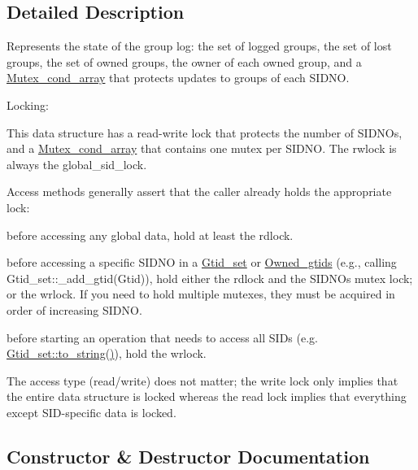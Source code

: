 \subsection{Detailed Description}
Represents the state of the group log\+: the set of logged groups, the set of lost groups, the set of owned groups, the owner of each owned group, and a \mbox{\hyperlink{classMutex__cond__array}{Mutex\+\_\+cond\+\_\+array}} that protects updates to groups of each S\+I\+D\+NO.

Locking\+:

This data structure has a read-\/write lock that protects the number of S\+I\+D\+N\+Os, and a \mbox{\hyperlink{classMutex__cond__array}{Mutex\+\_\+cond\+\_\+array}} that contains one mutex per S\+I\+D\+NO. The rwlock is always the global\+\_\+sid\+\_\+lock.

Access methods generally assert that the caller already holds the appropriate lock\+:


\begin{DoxyItemize}
\item before accessing any global data, hold at least the rdlock.
\item before accessing a specific S\+I\+D\+NO in a \mbox{\hyperlink{classGtid__set}{Gtid\+\_\+set}} or \mbox{\hyperlink{classOwned__gtids}{Owned\+\_\+gtids}} (e.\+g., calling Gtid\+\_\+set\+::\+\_\+add\+\_\+gtid(\+Gtid)), hold either the rdlock and the S\+I\+D\+NO\textquotesingle{}s mutex lock; or the wrlock. If you need to hold multiple mutexes, they must be acquired in order of increasing S\+I\+D\+NO.
\item before starting an operation that needs to access all S\+I\+Ds (e.\+g. \mbox{\hyperlink{classGtid__set_a256a8c891ab89b5388bdae4df8798d9b}{Gtid\+\_\+set\+::to\+\_\+string()}}), hold the wrlock.
\end{DoxyItemize}

The access type (read/write) does not matter; the write lock only implies that the entire data structure is locked whereas the read lock implies that everything except S\+ID-\/specific data is locked. 

\subsection{Constructor \& Destructor Documentation}
\mbox{\label{classGtid__state_a4e93b5ffa97a101e51aa722cf5f56ef3}} 
